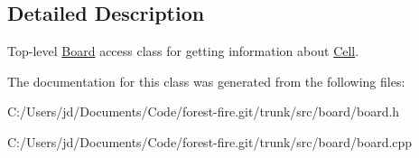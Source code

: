 \subsection{Detailed Description}
Top-\/level \hyperlink{class_board}{Board} access class for getting information about \hyperlink{class_cell}{Cell}. 

The documentation for this class was generated from the following files\+:\begin{DoxyCompactItemize}
\item 
C\+:/\+Users/jd/\+Documents/\+Code/forest-\/fire.\+git/trunk/src/board/board.\+h\item 
C\+:/\+Users/jd/\+Documents/\+Code/forest-\/fire.\+git/trunk/src/board/board.\+cpp\end{DoxyCompactItemize}
